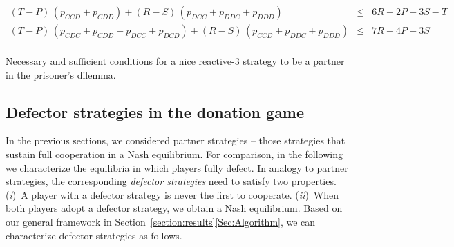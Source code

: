 \documentclass[9pt,twoside,lineno]{pnas-new}
\theoremstyle{plainCl1}
\theoremstyle{plainCl2}
\begin{document}
\begin{table}[t!]
{{\begin{equation*}
\begin{array}{rcl}
    (T - P)\,(p_{CCD} + p_{CDD}) + (R - S)\,(p_{DCC} + p_{DDC} + p_{DDD}) & \le & 6 R \!-\! 2 P \!-\! 3 S \!-\! T \\ [0.2cm]
    (T - P)\,(p_{CDC} + p_{CDD} + p_{DCC} + p_{DCD}) + (R - S)\,(p_{CCD} + p_{DDC} + p_{DDD}) & \le & 7 R \!-\! 4 P \!-\! 3 S \\ [0.2cm]
 \end{array}
 \end{equation*}
 }}
 \caption{Necessary and sufficient conditions for a nice reactive-3 strategy to be a partner in the  prisoner's dilemma.}
 \label{Tab:PartnerReactiveThreePD}
 \end{table}
 
 
 
 
 

\subsection{Defector strategies in the donation game}\label{section:defecting_donation_game}

In the previous sections, we considered partner strategies -- those strategies that sustain full cooperation in a Nash equilibrium.  
For comparison, in the following we characterize the equilibria in which players fully defect. 
In analogy to partner strategies, the corresponding {\it defector strategies} need to satisfy two properties. 
({\it i})~A player with a defector strategy is never the first to cooperate. 
({\it ii})~When both players adopt a defector strategy, we obtain a Nash equilibrium. 
Based on our general framework in Section~\ref{section:results}\ref{Sec:Algorithm}, we can characterize defector strategies as follows. 


\end{document}
